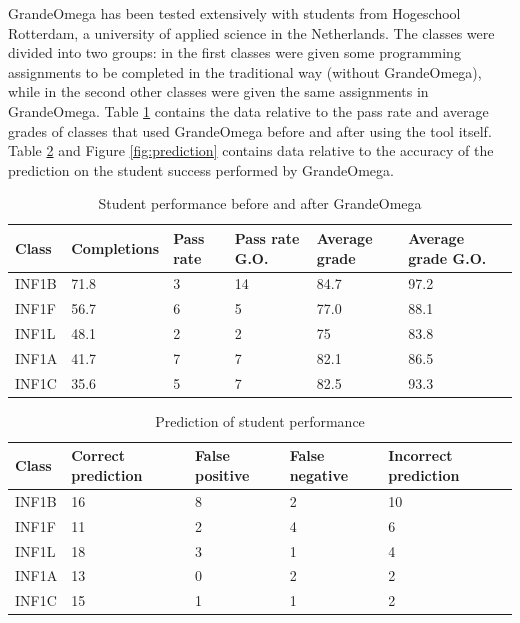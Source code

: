 GrandeOmega has been tested extensively with students from Hogeschool Rotterdam, a university of applied science in the Netherlands. The classes were divided into two groups: in the first classes were given some programming assignments to be completed in the traditional way (without GrandeOmega), while in the second other classes were given the same assignments in GrandeOmega. Table \ref{tab:performance_go} contains the data relative to the pass rate and average grades of classes that used GrandeOmega before and after using the tool itself. Table \ref{tab:prediction} and Figure \ref{fig:prediction} contains data relative to the accuracy of the prediction on the student success performed by GrandeOmega.

\begin{table}
	\begin{tabular}{|p{}|p{}|p{}|p{}|p{}|p{}|}
		\hline
		\textbf{Class} & Completions & Pass rate & Pass rate G.O. & Average grade & Average grade G.O. \\
		\hline
		INF1B & 71.8 & 3 & 14 & 84.7 & 97.2 \\
		\hline
		INF1F & 56.7 & 6 & 5 & 77.0 & 88.1 \\
		\hline
		INF1L & 48.1 & 2 & 2 & 75 & 83.8 \\
		\hline
		INF1A & 41.7 & 7 & 7 & 82.1 & 86.5 \\
		\hline
		INF1C & 35.6 & 5 & 7 & 82.5 & 93.3 \\
		\hline
	\end{tabular}
	\caption{Student performance before and after GrandeOmega}
	\label{tab:performance_go}
\end{table}

\begin{table}
	\begin{tabular}{|p{}|p{}|p{}|p{}|p{}|}
		\hline
		\textbf{Class} & \textbf{Correct prediction} & \textbf{False positive} & \textbf{False negative} & \textbf{Incorrect prediction} \\
		\hline
		INF1B & 16 & 8 & 2 & 10 \\
		\hline
		INF1F & 11 & 2 & 4 & 6 \\
		\hline
		INF1L & 18 & 3 & 1 & 4 \\
		\hline
		INF1A & 13 & 0 & 2 & 2 \\
		\hline
		INF1C & 15 & 1 & 1 & 2 \\
		\hline
	\end{tabular}
	\caption{Prediction of student performance}
	\label{tab:prediction}
\end{table}

